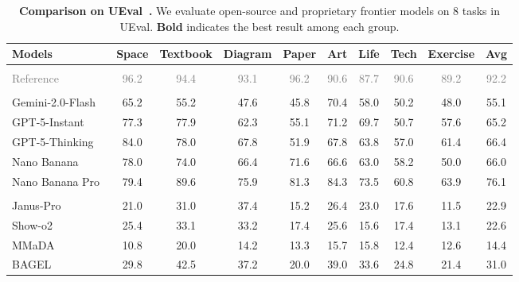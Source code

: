 \documentclass{article} %
\begin{document}
\setlength{\fboxrule}{1pt}
\begin{table}[t]
\scriptsize 
  \caption{\small \textbf{Comparison on UEval~\cite{li2026ueval}.} We evaluate open-source and proprietary frontier models on 8 tasks in UEval. \textbf{Bold} indicates the best result among each group.}
  \label{tab:ueval}
  \centering
{\setlength{\tabcolsep}{5pt}  
  \begin{tabular}{l ccccccccc}
    \toprule[0.1em]
    \textbf{Models} & \textbf{Space} & \textbf{Textbook} & \textbf{Diagram} & \textbf{Paper} & \textbf{Art} & \textbf{Life} & \textbf{Tech} & \textbf{Exercise} & \textbf{Avg} \\
    \midrule[0.1em]
    \rowcolor{gray!10}
    \multicolumn{10}{c}{\textbf{\textit{Reference}}} \\
    \midrule[0.1em]
    \textcolor{gray}{Reference} & \textcolor{gray}{96.2} & \textcolor{gray}{94.4} & \textcolor{gray}{93.1} & \textcolor{gray}{96.2} & \textcolor{gray}{90.6} & \textcolor{gray}{87.7} & \textcolor{gray}{90.6} & \textcolor{gray}{89.2} & \textcolor{gray}{92.2} \\
    \midrule[0.1em]
    \rowcolor{gray!10}
    \multicolumn{10}{c}{\textbf{\textit{Proprietary Frontier Models}}} \\
    \midrule[0.1em]
    Gemini-2.0-Flash~\cite{gemini2flash} & 65.2 & 55.2 & 47.6 & 45.8 & 70.4 & 58.0 & 50.2 & 48.0 & 55.1 \\
    GPT-5-Instant~\cite{gpt5} & 77.3 & 77.9 & 62.3 & 55.1 & 71.2 & 69.7 & 50.7 & 57.6 & 65.2 \\
    GPT-5-Thinking~\cite{gpt5} & 84.0 & 78.0 & 67.8 & 51.9 & 67.8 & 63.8 & 57.0 & 61.4 & 66.4 \\
    Nano Banana~\cite{nanobanana} & 78.0 & 74.0 & 66.4 & 71.6 & 66.6 & 63.0 & 58.2 & 50.0 & 66.0 \\
    Nano Banana Pro~\cite{nanopro} & 79.4 & 89.6 & 75.9 & 81.3 & 84.3 & 73.5 & 60.8 & 63.9 & 76.1 \\
    \midrule[0.1em]
    \rowcolor{gray!10}
    \multicolumn{10}{c}{\textbf{\textit{Open-Sourced Models}}} \\
    \midrule[0.1em]
    Janus-Pro~\cite{januspro} & 21.0 & 31.0 & 37.4 & 15.2 & 26.4 & 23.0 & 17.6 & 11.5 & 22.9 \\
    Show-o2~\cite{xie2025showo2} & 25.4 & 33.1 & 33.2 & 17.4 & 25.6 & 15.6 & 17.4 & 13.1 & 22.6 \\
    MMaDA~\cite{yang2025mmada} & 10.8 & 20.0 & 14.2 & 13.3 & 15.7 & 15.8 & 12.4 & 12.6 & 14.4 \\ 
    BAGEL~\cite{bagel} & 29.8 & 42.5 & 37.2 & 20.0 & 39.0 & 33.6 & 24.8 & 21.4 & 31.0 \\

\end{tabular}}
\end{table}
\end{document}
